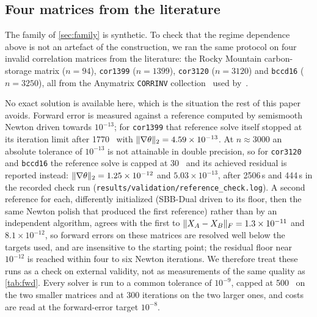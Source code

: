 \subsection{Four matrices from the literature}\label{sec:real}
The family of \cref{sec:family} is synthetic. To check that the regime
dependence above is not an artefact of the construction, we ran the same
protocol on four invalid correlation matrices from the literature: the
Rocky Mountain carbon-storage matrix ($n=94$), \texttt{cor1399} ($n=1399$),
\texttt{cor3120} ($n=3120$) and \texttt{bccd16} ($n=3250$), all from the
Anymatrix \texttt{CORRINV} collection~\cite{higham2022anymatrix} used
by~\cite{huynh2025accelerated}.

No exact solution is available here, which is the situation the rest of this
paper avoids. Forward error is measured against a reference computed by
semismooth Newton driven towards $10^{-13}$; for \texttt{cor1399} that
reference solve itself stopped at its iteration limit after 1770 \EVDs\ with
$\lVert \nabla\theta\rVert_2=4.59\times10^{-13}$. At $n\approx3000$ an absolute
tolerance of $10^{-13}$ is not attainable in double precision, so for
\texttt{cor3120} and \texttt{bccd16} the reference solve is capped at 30
\EVDs\ and its achieved residual is reported instead:
$\lVert \nabla\theta\rVert_2=1.25\times10^{-12}$ and $5.03\times10^{-13}$, after
2506\,s and 444\,s in the recorded check run
(\texttt{results/validation/reference\_check.log}). A second reference for
each, differently initialized (SBB-Dual driven
to its floor, then the same Newton polish that produced the first reference)
rather than by an independent algorithm, agrees with the first to
$\lVert X_A-X_B\rVert_F=1.3\times10^{-11}$ and $8.1\times10^{-12}$, so forward errors on
these matrices are resolved well below the targets used, and are insensitive
to the starting point; the residual floor
near $10^{-12}$ is reached within four to six Newton iterations. We therefore treat
these runs as a check on external
validity, not as measurements of the same quality as \cref{tab:fwd}. Every
solver is run to a common tolerance of $10^{-9}$, capped at 500 \EVDs\ on the
two smaller matrices and at 300 iterations on the two larger ones, and costs
are read at the forward-error target $10^{-8}$.

